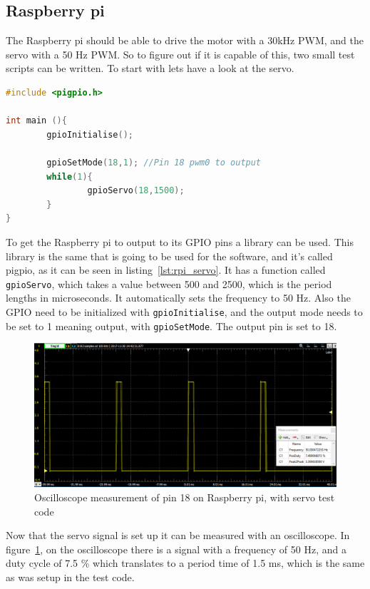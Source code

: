 \subsection{Raspberry pi}
The Raspberry pi should be able to drive the motor with a 30kHz PWM, and the servo with a 50 Hz PWM.
So to figure out if it is capable of this, two small test scripts can be written. To start with lets have a look at the servo.
\begin{lstlisting}[caption = {Test code to make the Raspberry pi run a servo}, captionpos=b, label={lst:rpi_servo}, language=C++,firstnumber=1]
#include <pigpio.h>

int main (){
        gpioInitialise();

        gpioSetMode(18,1); //Pin 18 pwm0 to output
        while(1){
                gpioServo(18,1500);
        }
}
\end{lstlisting}

To get the Raspberry pi to output to its GPIO pins a library can be used. This library is the same that is going to be used for the software, and it's called pigpio, as it can be seen in listing~\ref{lst:rpi_servo}. It has a function called \texttt{gpioServo}, which takes a value between 500 and 2500, which is the period lengths in microseconds. It automatically sets the frequency to 50 Hz. Also the GPIO need to be initialized with \texttt{gpioInitialise}, and the output mode needs to be set to 1 meaning output, with \texttt{gpioSetMode}. The output pin is set to 18. 

\begin{figure}[H]
\centering
\includegraphics[width=0.7\linewidth]{Images/Implementation/RPI_servo_PWM}
\caption{Oscilloscope measurement of pin 18 on Raspberry pi, with servo test code}
\label{fig:rpi_servo_pwm}
\end{figure}

Now that the servo signal is set up it can be measured with an oscilloscope. In figure~\ref{fig:rpi_servo_pwm}, on the oscilloscope there is a signal with a frequency of 50 Hz, and a duty cycle of 7.5 \% which translates to a period time of 1.5 ms, which is the same as was setup in the test code.

